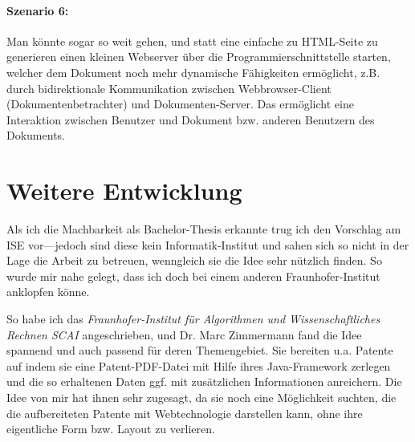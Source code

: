 \paragraph{Szenario 6:} Man könnte sogar so weit gehen, und statt eine einfache
zu HTML-Seite zu generieren einen kleinen Webserver über die
Programmierschnittstelle starten, welcher dem Dokument noch
mehr dynamische Fähigkeiten ermöglicht, z.B. durch bidirektionale
Kommunikation zwischen Webbrowser-Client (Dokumentenbetrachter) und
Dokumenten-Server. Das ermöglicht eine Interaktion zwischen Benutzer und
Dokument bzw. anderen Benutzern des Dokuments.





\section{Weitere Entwicklung}

Als ich die Machbarkeit als Bachelor-Thesis erkannte trug ich den
Vorschlag am ISE vor---jedoch sind
diese kein Informatik-Institut und sahen sich so nicht in der Lage die Arbeit
zu betreuen, wenngleich sie die Idee sehr nützlich finden. So wurde mir
nahe gelegt, dass ich doch bei einem anderen Fraunhofer-Institut anklopfen
könne.

So habe ich das \emph{Fraunhofer-Institut für Algorithmen und Wissenschaftliches
Rechnen SCAI} angeschrieben, und Dr. Marc Zimmermann fand
die Idee spannend und auch passend für deren Themengebiet. Sie bereiten u.a.
Patente auf indem sie eine Patent-PDF-Datei mit Hilfe ihres Java-Framework
zerlegen und die so erhaltenen Daten ggf. mit zusätzlichen Informationen
anreichern. Die Idee von mir hat ihnen sehr zugesagt, da sie noch eine
Möglichkeit suchten, die die aufbereiteten Patente mit Webtechnologie
darstellen kann, ohne ihre eigentliche Form bzw. Layout zu verlieren.


